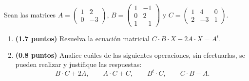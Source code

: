 
Sean las matrices
$A=\begin{pmatrix}1&2\\0&-3\end{pmatrix}$,
$B=\begin{pmatrix}1&-1\\0&2\\1&-1\end{pmatrix}$ y
$C=\begin{pmatrix}1&4&0\\2&-3&1\end{pmatrix}$.
\begin{enumerate}[label=\alph*)]
\item \textbf{(1.7 puntos)} Resuelva la ecuación matricial $C\cdot B\cdot X-2A\cdot X=A^t$.
\item \textbf{(0.8 puntos)} Analice cuáles de las siguientes operaciones, sin efectuarlas, se pueden realizar y justifique las respuestas:
\[
B\cdot C+2A,\qquad A\cdot C+C,\qquad B^t\cdot C,\qquad C\cdot B-A.
\]
\end{enumerate}
